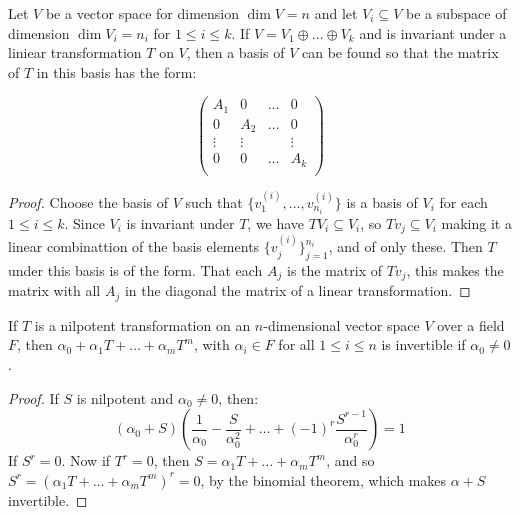  \begin{lemma}\label{3.4.8}
     Let $V$ be a vector space  for dimension $\dim{V}=n$ and let $V_i
     \subseteq V$ be a subspace of dimension  $\dim{V_i}=n_i$ for $1 \leq i
     \leq k$. If $V=V_1 \oplus \dots \oplus V_k$ and is invariant under a
     liniear transformation $T$ on  $V$, then a basis of  $V$ can be found so
     that the matrix of  $T$ in this basis has the form:

     \begin{equation}
         \begin{pmatrix}
             A_1    &   0   &   \dots   &   0   \\
             0      &   A_2 &   \dots   &   0\\
             \vdots &   \vdots  &           &   \vdots  \\
             0      &   0   &   \dots   &   A_k \\
         \end{pmatrix}
     \end{equation}
\end{lemma}
\begin{proof}
    Choose the basis of $V$ such that $\{v_1^{(i)}, \dots, v_{n_i}^{(i)}\}$ is
    a basis of $V_i$ for each  $1 \leq i \leq k$. Since $V_i$ is invariant
    under  $T$, we have  $TV_i \subseteq V_i$, so  $Tv_j \subseteq V_i$ making
    it a linear combinattion of the basis elements
    $\{v_j^{(i)}\}_{j=1}^{n_i}$, and of only these. Then $T$ under this basis
    is of the form. That each $A_j$ is the matrix of $Tv_j$, this makes the
    matrix with all $A_j$ in the diagonal the matrix of a linear
    transformation.
\end{proof}

\begin{lemma}\label{3.4.9}
    If $T$ is a nilpotent transformation on an  $n$-dimensional vector space
    $V$ over a field  $F$, then $\alpha_0+\alpha_1T+\dots+\alpha_mT^m$, with
    $\alpha_i \in F$ for all  $1 \leq i \leq n$ is invertible if  $\alpha_0
    \neq 0$.
\end{lemma}
\begin{proof}
    If $S$ is nilpotent and  $\alpha_0 \neq 0$, then:
    \begin{equation*}
        (\alpha_0+S)(\frac{1}{\alpha_0}-\frac{S}{\alpha_0^2}+ \dots +
        (-1)^r\frac{S^{r-1}}{\alpha_0^r})=1
    \end{equation*}
    If $S^r=0$. Now if $T^r=0$, then $S=\alpha_1T+\dots+\alpha_mT^m$,
    and so $S^r=(\alpha_1T+\dots+\alpha_mT^m)^r=0$, by the binomial
    theorem, which makes $\alpha+S$ invertible.
\end{proof}

